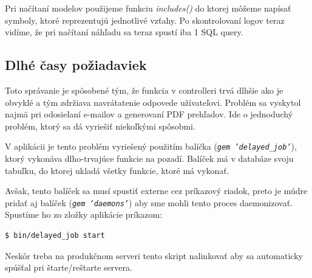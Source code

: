 Pri načítaní modelov použijeme funkciu \emph{includes()} do ktorej môžeme napísať symboly, ktoré reprezentujú jednotlivé vzťahy. Po skontrolovaní logov teraz vidíme, že pri načítaní náhľadu sa teraz spustí iba 1 SQL query.

\subsection{Dlhé časy požiadaviek}
\label{sec:request_time}

Toto správanie je spôsobené tým, že funkcia v controlleri trvá dlhšie ako je obvyklé a tým zdržiava navrátatenie odpovede užívateľovi.
Problém sa vyskytol najmä pri odosielaní e-mailov a generovaní PDF prehľadov. Ide o jednoduchý problém, ktorý sa dá vyriešiť niekoľkými spôsobmi. 

V aplikácii je tento problém vyriešený použitím balíčka (\emph{\texttt{gem 'delayed\_job'}}), ktorý vykonáva dlho-trvajúce funkcie na pozadí. Balíček má v databáze svoju tabuľku, do ktorej ukladá všetky funkcie, ktoré má vykonať. 

Avšak, tento balíček sa musí spustiť externe cez príkazový riadok, preto je múdre pridať aj balíček (\emph{\texttt{gem 'daemons'}}) aby sme mohli tento proces daemonizovať. Spustíme ho zo zložky aplikácie príkazom:

\begin{verbatim}
$ bin/delayed_job start
\end{verbatim}

Neskôr treba na produkčnom serveri tento skript nalinkovať aby sa automaticky spúšťal pri štarte/reštarte servera.